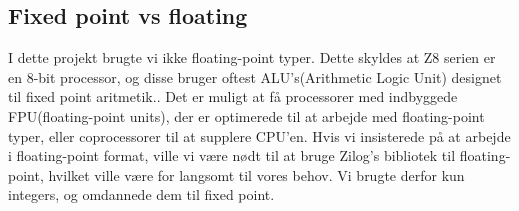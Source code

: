 \subsection{Fixed point vs floating}
I dette projekt brugte vi ikke floating-point typer. Dette skyldes at Z8 serien er en 8-bit processor, og disse bruger oftest ALU's(Arithmetic Logic Unit) designet til fixed point aritmetik.\cite[s. ~5]{Zicomp}. Det er muligt at få processorer med indbyggede FPU(floating-point units), der er optimerede til at arbejde med floating-point typer, eller coprocessorer til at supplere CPU'en. Hvis vi insisterede på at arbejde i floating-point format, ville vi være nødt til at bruge Zilog's bibliotek til floating-point, hvilket ville være for langsomt til vores behov\cite{Zifloat}\cite{Zifloatmult}. Vi brugte derfor kun integers, og omdannede dem til fixed point.
